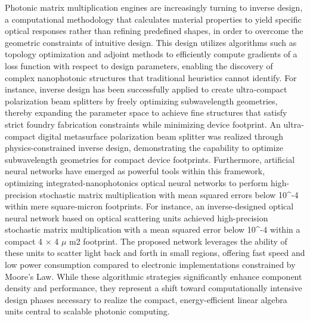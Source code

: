 Photonic matrix multiplication engines are increasingly turning to inverse design, a computational methodology that calculates material properties to yield specific optical responses rather than refining predefined shapes, in order to overcome the geometric constraints of intuitive design. \citep{doi_10_1364_oe_530479_45946046} \citep{doi_10_1117_12_2649964_b6e13b8f} This design utilizes algorithms such as topology optimization and adjoint methods to efficiently compute gradients of a loss function with respect to design parameters, enabling the discovery of complex nanophotonic structures that traditional heuristics cannot identify. For instance, inverse design has been successfully applied to create ultra-compact polarization beam splitters by freely optimizing subwavelength geometries, thereby expanding the parameter space to achieve fine structures that satisfy strict foundry fabrication constraints while minimizing device footprint. An ultra-compact digital metasurface polarization beam splitter was realized through physics-constrained inverse design, demonstrating the capability to optimize subwavelength geometries for compact device footprints. \citep{doi_10_3390_app121910064_718c1a26} Furthermore, artificial neural networks have emerged as powerful tools within this framework, optimizing integrated-nanophotonics optical neural networks to perform high-precision stochastic matrix multiplication with mean squared errors below 10\^{}-4 within mere square-micron footprints. For instance, an inverse-designed optical neural network based on optical scattering units achieved high-precision stochastic matrix multiplication with a mean squared error below 10\^{}-4 within a compact 4 \(\times\) 4 \(\mu\) m2 footprint. The proposed network leverages the ability of these units to scatter light back and forth in small regions, offering fast speed and low power consumption compared to electronic implementations constrained by Moore's Law. \citep{doi_10_1016_j_scib_2020_03_042_6b632485} While these algorithmic strategies significantly enhance component density and performance, they represent a shift toward computationally intensive design phases necessary to realize the compact, energy-efficient linear algebra units central to scalable photonic computing. \citep{doi_10_1515_nanoph_2020_0379_1cc596ab} \citep{doi_10_3390_app121910064_718c1a26} \citep{doi_10_1016_j_scib_2020_03_042_6b632485}


